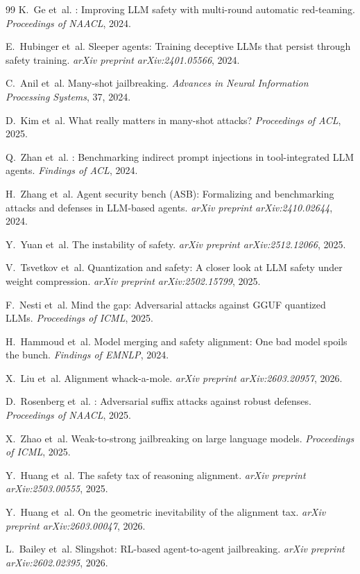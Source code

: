\documentclass[11pt]{article}
\begin{document}
\begin{thebibliography}{99}
K.~Ge et~al.
: Improving {LLM} safety with multi-round automatic
  red-teaming.
\newblock \emph{Proceedings of NAACL}, 2024.

E.~Hubinger et~al.
\newblock Sleeper agents: Training deceptive {LLMs} that persist through
  safety training.
\newblock \emph{arXiv preprint arXiv:2401.05566}, 2024.

C.~Anil et~al.
\newblock Many-shot jailbreaking.
\newblock \emph{Advances in Neural Information Processing Systems}, 37, 2024.

D.~Kim et~al.
\newblock What really matters in many-shot attacks?
\newblock \emph{Proceedings of ACL}, 2025.

Q.~Zhan et~al.
: Benchmarking indirect prompt injections in
  tool-integrated {LLM} agents.
\newblock \emph{Findings of ACL}, 2024.

H.~Zhang et~al.
\newblock Agent security bench ({ASB}): Formalizing and benchmarking
  attacks and defenses in {LLM}-based agents.
\newblock \emph{arXiv preprint arXiv:2410.02644}, 2024.

Y.~Yuan et~al.
\newblock The instability of safety.
\newblock \emph{arXiv preprint arXiv:2512.12066}, 2025.

V.~Tsvetkov et~al.
\newblock Quantization and safety: A closer look at {LLM} safety
  under weight compression.
\newblock \emph{arXiv preprint arXiv:2502.15799}, 2025.

F.~Nesti et~al.
\newblock Mind the gap: Adversarial attacks against {GGUF} quantized
  {LLMs}.
\newblock \emph{Proceedings of ICML}, 2025.

H.~Hammoud et~al.
\newblock Model merging and safety alignment: One bad model spoils the
  bunch.
\newblock \emph{Findings of EMNLP}, 2024.

X.~Liu et~al.
\newblock Alignment whack-a-mole.
\newblock \emph{arXiv preprint arXiv:2603.20957}, 2026.

D.~Rosenberg et~al.
: Adversarial suffix attacks against robust defenses.
\newblock \emph{Proceedings of NAACL}, 2025.

X.~Zhao et~al.
\newblock Weak-to-strong jailbreaking on large language models.
\newblock \emph{Proceedings of ICML}, 2025.

Y.~Huang et~al.
\newblock The safety tax of reasoning alignment.
\newblock \emph{arXiv preprint arXiv:2503.00555}, 2025.

Y.~Huang et~al.
\newblock On the geometric inevitability of the alignment tax.
\newblock \emph{arXiv preprint arXiv:2603.00047}, 2026.

L.~Bailey et~al.
\newblock Slingshot: {RL}-based agent-to-agent jailbreaking.
\newblock \emph{arXiv preprint arXiv:2602.02395}, 2026.

\end{thebibliography}
\end{document}
